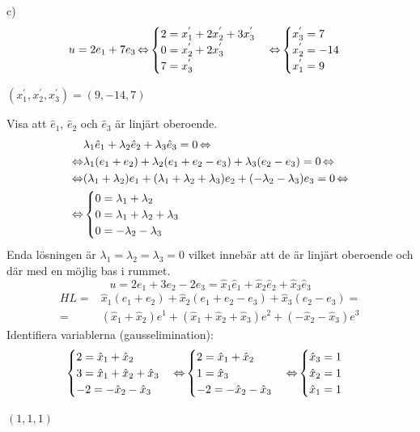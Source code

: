 \begin{task}{c)}
	\[u=
	2e_1+7e_3 \operatorname{\Leftrightarrow}
	\begin{cases}
		2=x^{'}_1+2x^{'}_2+3x^{'}_3 \\
		0=x^{'}_2+2x^{'}_3 \\
		7=x^{'}_3
	\end{cases} \operatorname{\Leftrightarrow}
	\begin{cases}
		x^{'}_3=7 \\
		x^{'}_2=-14 \\
		x^{'}_1=9
	\end{cases}\]
	
	\ans $(x^{'}_1,x^{'}_2,x^{'}_3)=(9,-14,7)$
\end{task}

\pagebreak
\begin{task}{2.25}
	Visa att $\hat{e}_1$, $\hat{e}_2$ och $\hat{e}_3$ är linjärt oberoende.
	\begin{align*}
		&\lambda_1\hat{e}_1+\lambda_2\hat{e}_2+\lambda_3\hat{e}_3=0 \operatorname{\Leftrightarrow} \\ \operatorname{\Leftrightarrow}
		&\lambda_1(e_1+e_2)+\lambda_2(e_1+e_2-e_3)+\lambda_3(e_2-e_3)=0 \operatorname{\Leftrightarrow} \\ \operatorname{\Leftrightarrow}
		&(\lambda_1+\lambda_2)e_1+(\lambda_1+\lambda_2+\lambda_3)e_2+(-\lambda_2-\lambda_3)e_3=0 \operatorname{\Leftrightarrow} \\ \operatorname{\Leftrightarrow}
		&\begin{cases}
		0=\lambda_1+\lambda_2 \\
		0=\lambda_1+\lambda_2+\lambda_3 \\
		0=-\lambda_2-\lambda_3 \\
	\end{cases}
	\end{align*}
	Enda lösningen är $\lambda_1=\lambda_2=\lambda_3=0$ vilket innebär att de är linjärt oberoende och där med en möjlig bas i rummet.
	\[u=2e_1+3e_2-2e_3=\hat{x}_1\hat{e}_1+\hat{x}_2\hat{e}_2+\hat{x}_3\hat{e}_3\]
	\begin{align*}
		HL=&\hat{x}_1(e_1+e_2)+\hat{x}_2(e_1+e_2-e_3)+\hat{x}_3(e_2-e_3)= \\ =
		&(\hat{x}_1+\hat{x}_2)e^1+(\hat{x}_1+\hat{x}_2+\hat{x}_3)e^2+(-\hat{x}_2-\hat{x}_3)e^3
	\end{align*}
	Identifiera variablerna (gausselimination):
	\[\begin{cases}
		2=\hat{x}_1+\hat{x}_2 \\
		3=\hat{x}_1+\hat{x}_2+\hat{x}_3 \\
		-2=-\hat{x}_2-\hat{x}_3
	\end{cases} \operatorname{\Leftrightarrow}
	\begin{cases}
		2=\hat{x}_1+\hat{x}_2 \\
		1=\hat{x}_3 \\
		-2=-\hat{x}_2-\hat{x}_3
	\end{cases} \operatorname{\Leftrightarrow}
	\begin{cases}
		\hat{x}_3=1 \\
		\hat{x}_2=1 \\
		\hat{x}_1=1
	\end{cases}
	\]
	
	\ans $(1,1,1)$
\end{task}

